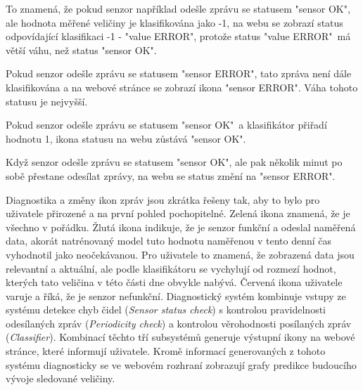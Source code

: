To znamená, že pokud senzor například odešle zprávu se statusem "sensor OK", ale hodnota měřené veličiny je klasifikována jako -1, na webu se zobrazí status odpovídající klasifikaci -1 - "value ERROR", protože status "value ERROR"\ má větší váhu, než status "sensor OK". \par
Pokud senzor odešle zprávu se statusem "sensor ERROR", tato zpráva není dále klasifikována a na webové stránce se zobrazí ikona "sensor ERROR". Váha tohoto statusu je nejvyšší. \par
Pokud senzor odešle zprávu se statusem "sensor OK"\ a klasifikátor přiřadí hodnotu 1, ikona statusu na webu zůstává "sensor OK". \par
Když senzor odešle zprávu se statusem "sensor OK", ale pak několik minut po sobě přestane odesílat zprávy, na webu se status změní na "sensor ERROR". \par
Diagnostika a změny ikon zpráv jsou zkrátka řešeny tak, aby to bylo pro uživatele přirozené a na první pohled pochopitelné. Zelená ikona znamená, že je všechno v pořádku. Žlutá ikona indikuje, že je senzor funkční a odeslal naměřená data, akorát natrénovaný model tuto hodnotu naměřenou v tento denní čas vyhodnotil jako neočekávanou. Pro uživatele to znamená, že zobrazená data jsou relevantní a aktuální, ale podle klasifikátoru se vychylují od rozmezí hodnot, kterých tato veličina v této části dne obvykle nabývá. Červená ikona uživatele varuje a říká, že je senzor nefunkční. Diagnostický systém kombinuje vstupy ze systému detekce chyb čidel (\textit{Sensor status check}) s kontrolou  pravidelnosti odesílaných zpráv (\textit{Periodicity check}) a kontrolou věrohodnosti posílaných zpráv (\textit{Classifier}). Kombinací těchto tří subsystémů generuje výstupní ikony na webové stránce, které informují uživatele. Kromě informací generovaných z tohoto systému diagnosticky se ve webovém rozhraní zobrazují grafy predikce budoucího vývoje sledované veličiny. 


